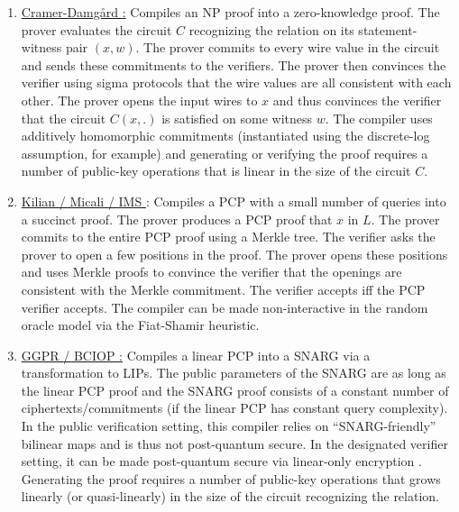 	\begin{enumerate}[label=\alph*.]
  

	\item \underline{Cramer-Damgård \cite{1998:crypto:zkps-for-finite-field-arithmetic}:} 
	Compiles an NP proof into a zero-knowledge proof. 
	The prover evaluates the circuit $C$ recognizing the relation on its statement-witness pair $(x,w)$. 
	The prover commits to every wire value in the circuit and sends these commitments to the verifiers. 
	The prover then convinces the verifier using sigma protocols that the wire values are all consistent with each other. 
	The prover opens the input wires to $x$ and thus convinces the verifier that the circuit $C(x, .)$ is satisfied on some witness $w$. 
	The compiler uses additively homomorphic commitments (instantiated using the discrete-log assumption, for example) and generating or verifying the proof requires a number of public-key operations that is linear in the size of the circuit $C$.
   
	\item \underline{Kilian \cite{1995:crypto:Improved-Efficient-Arguments} / Micali \cite{2000:SIAM:Computationally-Sound-Proofs} / IMS \cite{2012:tcc:On-Efficient-ZK-PCPs}}: 
	Compiles a PCP with a small number of queries into a succinct proof. 
	The prover produces a PCP proof that $x$ in $L$. 
	The prover commits to the entire PCP proof using a Merkle tree. 
	The verifier asks the prover to open a few positions in the proof. 
	The prover opens these positions and uses Merkle proofs to convince the verifier that the openings are consistent with the Merkle commitment. 
	The verifier accepts iff the PCP verifier accepts. 
	The compiler can be made non-interactive in the random oracle model via the Fiat-Shamir heuristic.
	
  \item \underline{GGPR \cite{2013:QSPs-and-succinct-NIZKs-without-PCPs} / BCIOP \cite{2013:tcc:snargs-via-LIPs}:} 
	Compiles a linear PCP into a SNARG via a transformation to LIPs. 
	The public parameters of the SNARG are as long as the linear PCP proof and the SNARG proof consists of a constant number of ciphertexts/commitments (if the linear PCP has constant query complexity). 
	In the public verification setting, this compiler relies on “SNARG-friendly” bilinear maps and is thus not post-quantum secure. 
	In the designated verifier setting, it can be made post-quantum secure via linear-only encryption \cite{2017:eurocrypt:lattice-based-snargs}. 
	Generating the proof requires a number of public-key operations that grows linearly (or quasi-linearly) in the size of the circuit recognizing the relation.
   

\end{enumerate}
